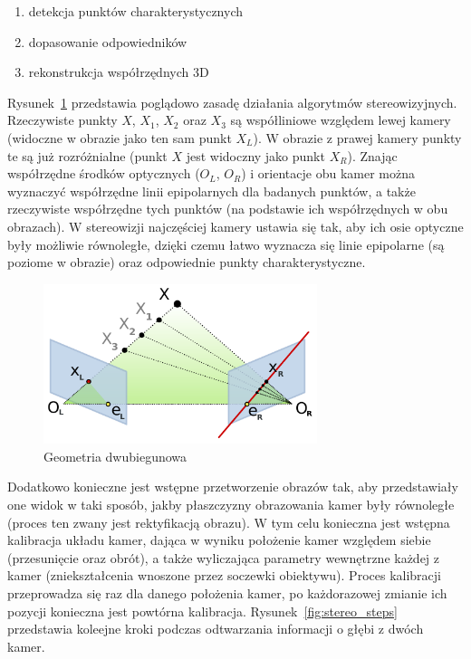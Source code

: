 \begin{enumerate}
\item detekcja punktów charakterystycznych
\item dopasowanie odpowiedników
\item rekonstrukcja współrzędnych 3D
\end{enumerate}

Rysunek~\ref{fig:epipolar} przedstawia poglądowo zasadę działania algorytmów
stereowizyjnych. Rzeczywiste punkty $X$, $X_1$, $X_2$ oraz $X_3$ są współliniowe
względem lewej kamery (widoczne w obrazie jako ten sam punkt $X_L$). W obrazie z
prawej kamery punkty te są już rozróżnialne (punkt $X$ jest widoczny jako punkt
$X_R$). Znając współrzędne środków optycznych ($O_L$, $O_R$) i orientacje obu
kamer można wyznaczyć współrzędne linii epipolarnych dla badanych punktów, a
także rzeczywiste współrzędne tych punktów (na podstawie ich współrzędnych w
obu obrazach). W stereowizji najczęściej kamery ustawia się tak, aby ich osie
optyczne były możliwie równoległe, dzięki czemu łatwo wyznacza się linie
epipolarne (są poziome w obrazie) oraz odpowiednie punkty charakterystyczne.

\begin{figure}[h!]
\centering
\includegraphics[width=8cm]{../../Common/img/Epipolar_geometry} 
\caption{Geometria dwubiegunowa}
\label{fig:epipolar}
\end{figure}

Dodatkowo konieczne jest wstępne przetworzenie obrazów tak, aby przedstawiały
one widok w taki sposób, jakby płaszczyzny obrazowania kamer były równoległe
(proces ten zwany jest rektyfikacją obrazu). W tym celu konieczna jest wstępna
kalibracja układu kamer, dająca w wyniku położenie kamer względem siebie
(przesunięcie oraz obrót), a także wyliczająca parametry wewnętrzne każdej z
kamer (zniekształcenia wnoszone przez soczewki obiektywu). Proces kalibracji
przeprowadza się raz dla danego położenia kamer, po każdorazowej zmianie ich
pozycji konieczna jest powtórna kalibracja. Rysunek~\ref{fig:stereo_steps}
przedstawia koleejne kroki podczas odtwarzania informacji o głębi z dwóch kamer.

